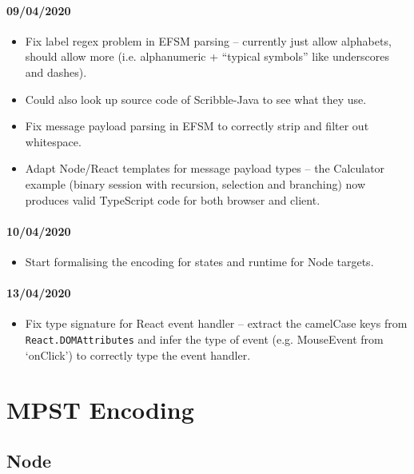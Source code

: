 \documentclass{article}
\begin{document}
\paragraph{09/04/2020}
\begin{itemize}
\item
Fix label regex problem in EFSM parsing -- currently just
allow alphabets, should allow more (i.e. alphanumeric
+ ``typical symbols'' like underscores and dashes).

\item
Could also look up source code of Scribble-Java to see what they use.

\item
Fix message payload parsing in EFSM to correctly strip and filter out whitespace.

\item
Adapt Node/React templates for message payload types -- the Calculator example
(binary session with recursion, selection and branching) now produces valid TypeScript
code for both browser and client.

\end{itemize}

\paragraph{10/04/2020}
\begin{itemize}
\item
Start formalising the encoding for states and runtime for Node targets.
\end{itemize}

\paragraph{13/04/2020}
\begin{itemize}
\item
Fix type signature for React event handler -- extract the 
camelCase keys from \texttt{React.DOMAttributes} and infer
the type of event (e.g. MouseEvent from `onClick') to correctly
type the event handler.
\end{itemize}

\section{MPST Encoding}

\subsection{Node}
\end{document}
